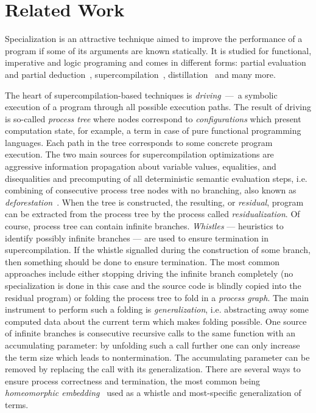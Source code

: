 \section{Related Work}

Specialization is an attractive technique aimed to improve the performance of a program if some of its arguments are known statically.
It is studied for functional, imperative and logic programing and comes in different forms: partial evaluation~\cite{jonesbook} and partial deduction~\cite{lloyd1991partial}, supercompilation~\cite{soerensen1996positive}, distillation~\cite{hamilton2007distillation} and many more.


The heart of supercompilation-based techniques is \emph{driving}~---~a symbolic execution of a program through all possible execution paths.
The result of driving is so-called \emph{process tree} where nodes correspond to \emph{configurations} which present computation state, for example, a term in case of pure functional programming languages.
Each path in the tree corresponds to some concrete program execution.
The two main sources for supercompilation optimizations are aggressive information propagation about variable values, equalities, and disequalities and precomputing of all deterministic semantic evaluation steps, i.e. combining of consecutive process tree nodes with no branching, also known as \emph{deforestation}~\cite{TODO}.
When the tree is constructed, the resulting, or \emph{residual}, program can be extracted from the process tree by the process called \emph{residualization}.
Of course, process tree can contain infinite branches.
\emph{Whistles} --- heuristics to identify possibly infinite branches --- are used to ensure termination in supercompilation.
If the whistle signalled during the construction of some branch, then something should be done to ensure termination.
The most common approaches include either stopping driving the infinite branch completely (no specialization is done in this case and the source code is blindly copied into the residual program) or folding the process tree to fold in a \emph{process graph}.
The main instrument to perform such a folding is \emph{generalization}, i.e. abstracting away some computed data about the current term which makes folding possible.
One source of infinite branches is consecutive recursive calls to the same function with an accumulating parameter: by unfolding such a call further one can only increase the term size which leads to nontermination.
The accumulating parameter can be removed by replacing the call with its generalization.
There are several ways to ensure process correctness and termination, the most common being \emph{homeomorphic embedding}~\cite{TODO} used as a whistle and most-specific generalization of terms.

